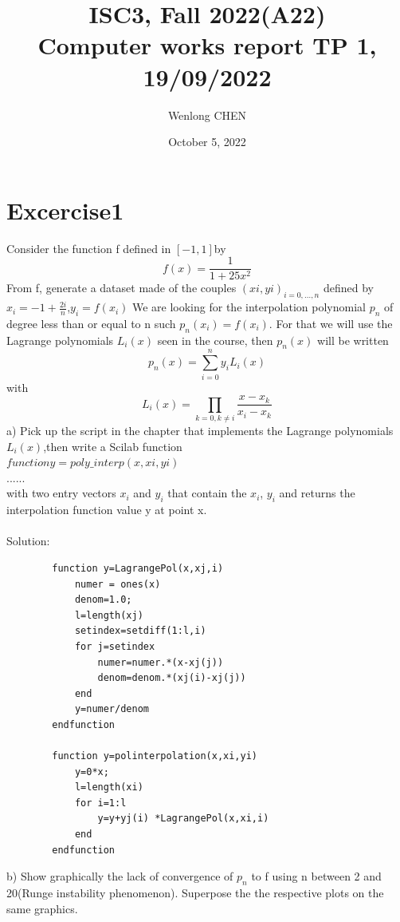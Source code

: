 \documentclass[11pt]{article}
\title{ISC3, Fall 2022(A22)\\
Computer works report TP 1, 19/09/2022}
\author{Wenlong CHEN}
\date{October 5, 2022}
\begin{document}
    \maketitle
    \section*{Excercise1}
    Consider the function f defined in $[-1,1]$by
    $$
    f(x)=\frac{1}{1+25x^2}
    $$
    From f, generate a dataset made of the couples $(xi, yi)_{i=0,\ldots,n}$ defined by $x_i=-1+\frac{2i}{n}$,$y_i=f(x_i)$ We are looking for the interpolation polynomial $p_n$ of degree less than or equal to n such $p_n(x_i) = f(x_i)$. For that we will use the Lagrange polynomials $L_i(x)$ seen in the course, then $p_n(x)$ will be written
    $$
    p_n(x)=\sum_{i=0}^ny_iL_i(x)
    $$
    with
     $$
    L_i(x) = \prod_{k=0,k\neq i}\frac{x-x_k}{x_i-x_k}
    $$
    a) Pick up the script in the chapter that implements the Lagrange polynomials$L_i(x)$,then write a Scilab function
    \\$function y = poly\_interp(x, xi, yi)$\\
    ......\\
    with two entry vectors $x_i$ and $y_i$ that contain the $x_i$, $y_i$ and returns the interpolation function value y at point x.\\
    \\
    Solution:\\

    
    \begin{verbatim}
        function y=LagrangePol(x,xj,i)
            numer = ones(x)
            denom=1.0;
            l=length(xj)
            setindex=setdiff(1:l,i)
            for j=setindex
                numer=numer.*(x-xj(j))
                denom=denom.*(xj(i)-xj(j))
            end
            y=numer/denom
        endfunction

        function y=polinterpolation(x,xi,yi)
            y=0*x;
            l=length(xi)
            for i=1:l
                y=y+yj(i) *LagrangePol(x,xi,i)
            end
        endfunction
    \end{verbatim}
    b) Show graphically the lack of convergence of $p_n$ to f using n between 2 and 20(Runge instability phenomenon). Superpose the the respective plots on the same graphics.\\
    
\end{document}

